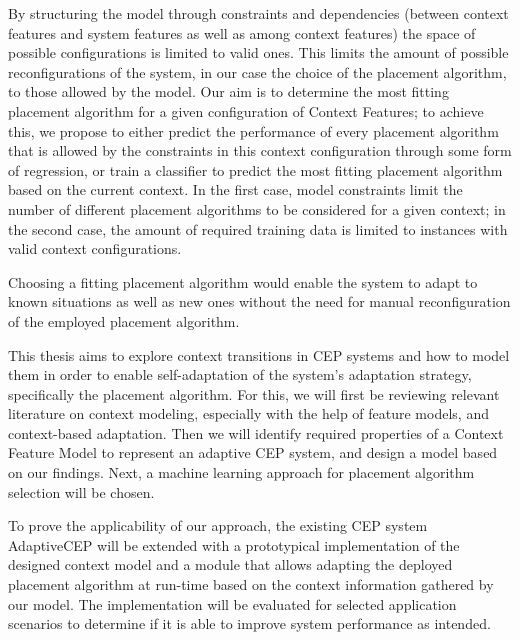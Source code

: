  By structuring the model through constraints and dependencies (between context features and system features as well as among context features) the space of possible configurations is limited to valid ones. This limits the amount of possible reconfigurations of the system, in our case the choice of the placement algorithm, to those allowed by the model.  
 Our aim is to determine the most fitting placement algorithm for a given configuration of Context Features; to achieve this, we propose to either predict the performance of every placement algorithm that is allowed by the constraints in this context configuration through some form of regression, or train a classifier to predict the most fitting placement algorithm based on the current context. 
 In the first case, model constraints limit the number of different placement algorithms to be considered for a given context; in the second case, the amount of required training data is limited to instances with valid context configurations.
 
 Choosing a fitting placement algorithm would enable the system to adapt to known situations as well as new ones without the need for manual reconfiguration of the employed placement algorithm.



This thesis aims to explore context transitions in CEP systems and how to model them in order to enable self-adaptation of the system's adaptation strategy, specifically the placement algorithm. 
For this, we will first be reviewing relevant literature on context modeling, especially with the help of feature models, and context-based adaptation. Then we will identify required properties of a Context Feature Model to represent an adaptive CEP system, and design a model based on our findings. Next, a machine learning approach for placement algorithm selection will be chosen. 

To prove the applicability of our approach, the existing CEP system AdaptiveCEP will be extended with a prototypical implementation of the designed context model and a module that allows adapting the deployed placement algorithm at run-time based on the context information gathered by our model. The implementation will be evaluated for selected application scenarios to determine if it is able to improve system performance as intended.


